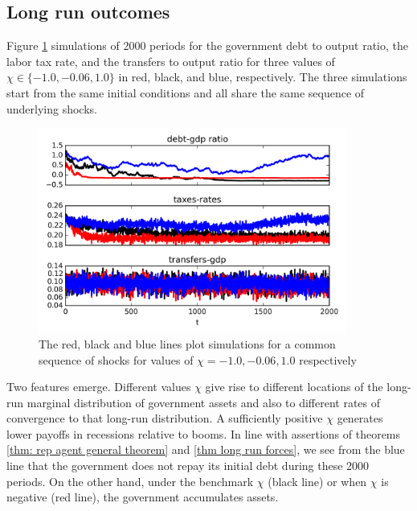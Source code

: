 \documentclass[thmsb,11pt]{article}
\begin{document}
\subsection{Long run outcomes}\label{sec:longrunsimul}
Figure \ref{fig:long_simulation} simulations of  2000 periods for the government debt to output ratio, the labor tax rate,  and the transfers to output ratio
for three values of $\chi \in \{-1.0,-0.06,1.0\}$ in red, black, and blue, respectively. The three simulations start from the  same initial conditions and
all share the same sequence of underlying shocks.

 {
  \begin{figure}
  \label{fig:long_simulation}
    \centering
    \includegraphics[width = 0.9\textwidth]{cesplots/long_simulation_debt.png}
    \caption{The red, black and blue lines plot simulations for a common sequence of shocks for values of $\chi=-1.0,-0.06,1.0$ respectively}
  \end{figure}

}

Two features emerge.   Different values $\chi$ give rise to different locations of the long-run marginal distribution of government assets and also to different  rates  of convergence
to that long-run distribution.
A sufficiently positive $\chi$ generates lower payoffs in recessions relative to booms. In line with assertions of  theorems \ref{thm: rep agent general theorem} and  \ref{thm long run forces},
we see from the blue line  that  the government does not repay its initial debt during these 2000 periods. On the other
hand, under the benchmark $\chi$  (black line) or  when $\chi$ is negative (red line), the government accumulates assets.
\end{document}
